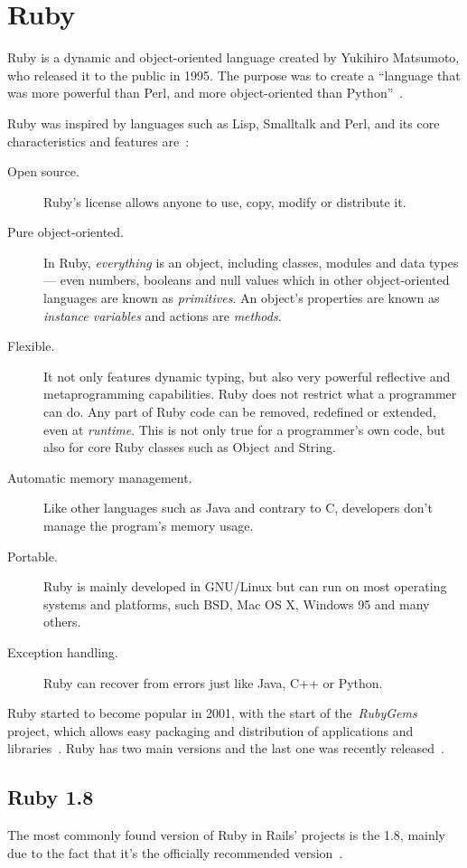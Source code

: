 \section{Ruby} %
\label{tech:sec:ruby}
Ruby is a dynamic and object-oriented language created by Yukihiro Matsumoto, who released it to the public in 1995. The purpose was to create a ``language that was more powerful than Perl, and more object-oriented than Python''~\cite{interview_creator_ruby}.

Ruby was inspired by languages such as Lisp, Smalltalk and Perl, and its core characteristics and features are~\cite{ruby_about, ruby_book}:
\begin{description}
  \item[Open source.] Ruby's license allows anyone to use, copy, modify or distribute it.
  \item[Pure object-oriented.] In Ruby, \emph{everything} is an object, including classes, modules and data types --- even numbers, booleans and null values which in other object-oriented languages are known as \emph{primitives}. An object's properties are known as \emph{instance variables} and actions are \emph{methods}.
  \item[Flexible.] It not only features dynamic typing, but also very powerful reflective and metaprogramming capabilities. Ruby does not restrict what a programmer can do. Any part of Ruby code can be removed, redefined or extended, even at \emph{runtime}. This is not only true for a programmer's own code, but also for core Ruby classes such as Object and String.
 \item[Automatic memory management.] Like other languages such as Java and contrary to C, developers don't manage the program's memory usage.
  \item[Portable.] Ruby is mainly developed in GNU/Linux but can run on most operating systems and platforms, such BSD, Mac OS X, Windows 95 and many others.
  \item[Exception handling.] Ruby can recover from errors just like Java, C++ or Python.
\end{description}
Ruby started to become popular in 2001, with the start of the~\textit{RubyGems} project, which allows easy packaging and distribution of applications and libraries~\cite{railssolutions}. Ruby has two main versions and the last one was recently released~\cite{ruby191_release}.


\subsection{Ruby 1.8}
The most commonly found version of Ruby in Rails' projects is the 1.8, mainly due to the fact that it's the officially recommended version~\cite{rubyonrails_download}.

